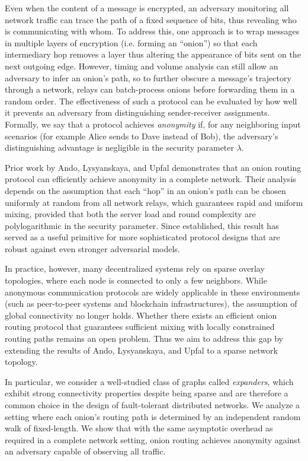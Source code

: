 Even when the content of a message is encrypted, an adversary monitoring all network traffic can trace the path of a fixed sequence of bits, thus revealing  who is communicating with whom. To address this, one approach is to wrap messages in multiple layers of encryption (i.e. forming an ``onion'') so that each intermediary hop removes a layer thus altering the appearance of bits sent on the next outgoing edge. However, timing and volume analysis can still allow an adversary to infer an onion's path, so to further obscure a message's trajectory through a network, relays can batch-process onions before forwarding them in a random order. The effectiveness of such a protocol can be evaluated by how well it prevents an adversary from distinguishing sender-receiver assignments. Formally, we say that a protocol achieves \textit{anonymity} if, for any neighboring input scenarios (for example Alice sends to Dave instead of Bob), the adversary’s distinguishing advantage is negligible in the security parameter $\lambda$. 

Prior work by Ando, Lysyanskaya, and Upfal \cite{ICALP:AndLysUpf18} demonstrates that an onion routing protocol can efficiently achieve anonymity in a complete network. Their analysis depends on the assumption that each ``hop'' in an onion's path can be chosen uniformly at random from all network relays, which guarantees rapid and uniform mixing, provided that both the server load and round complexity are polylogarithmic in the security parameter. Since established, this result has served as a useful primitive for more sophisticated protocol designs \cite{ando2024bruisable, ando2019complexity} that are robust against even stronger adversarial models.

In practice, however, many decentralized systems rely on sparse overlay topologies, where each node is connected to only a few neighbors. While anonymous communication protocols are widely applicable in these environments (such as peer-to-peer systems and blockchain infrastructures), the assumption of global connectivity no longer holds. Whether there exists an efficient onion routing protocol that guarantees sufficient mixing with locally constrained routing paths remains an open problem. Thus we aim to address this gap by extending the results of Ando, Lysyanskaya, and Upfal \cite{ICALP:AndLysUpf18} to a sparse network topology.

In particular, we consider a well-studied class of graphs called \textit{expanders}, which exhibit strong connectivity properties despite being sparse and are therefore a common choice in the design of fault-tolerant distributed networks. We analyze a setting where each onion's routing path is determined by an independent random walk of fixed-length. We show that with the same asymptotic overhead as required in a complete network setting, onion routing achieves anonymity against an adversary capable of observing all traffic.

